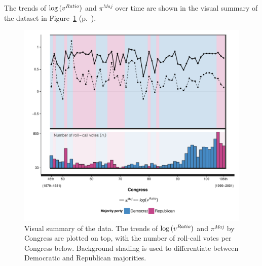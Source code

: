 The trends of $\log{(v^{\it Ratio})}$ and $\pi^{Maj}$ over time are shown in the visual summary 
of the dataset in Figure~\ref{fig:data_summary} (p.~\pageref{fig:data_summary}). \\[10pt]


\begin{figure}[p]
\centering
	\includegraphics[scale=0.75]{sections/figs/vis_summary2}
\caption{Visual summary of the data. The trends of $\log{(v^{\it Ratio} )}$ and $\pi^{Maj}$ by 
Congress are plotted on top, with the number of roll-call votes per Congress below. Background 
shading is used to differentiate between Democratic and Republican majorities.}
\label{fig:data_summary}
\end{figure}
%

%

